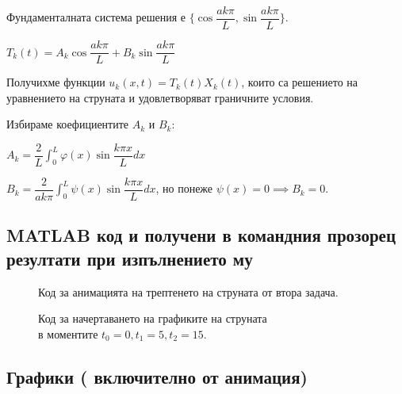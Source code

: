 \documentclass[14pt]{extarticle}
\let\frac\dfrac
\begin{document}
Фундаменталната система решения е $\{ \cos\frac{ak\pi}{L}, \sin\frac{ak\pi}{L} \}$.

$T_k(t) = A_k\cos\frac{ak\pi}{L} + B_k\sin\frac{ak\pi}{L}$

Получихме функции $u_k(x,t) = T_k(t)X_k(t)$, които са решението на уравнението на струната и удовлетворяват граничните условия.

Избираме коефициентите $A_k$ и $B_k$:

$\displaystyle A_k = \frac{2}{L} \int_0^L \varphi(x)\sin\frac{k\pi x}{L} dx$

$\displaystyle B_k = \frac{2}{ak\pi} \int_0^L \psi(x)\sin\frac{k\pi x}{L} dx$, но понеже $\psi(x) = 0 \implies B_k = 0$.

\subsection{MATLAB  код и получени в командния прозорец резултати при изпълнението му}

\begin{figure}[H]
	\begin{quote}
	
	\end{quote}
	\centering
	\caption{Код за анимацията на трептенето на струната от втора задача.}
\end{figure}

\begin{figure}[H]
	\centering
	\captionsetup{justification=centering,margin=2cm}
	\begin{quote}
	
	\end{quote}
	\caption{Код за начертаването на графиките на струната\\в моментите $t_0 = 0, t_1 = 5, t_2 = 15$.}
\end{figure}

\subsection{Графики ( включително от анимация)}
\end{document}
